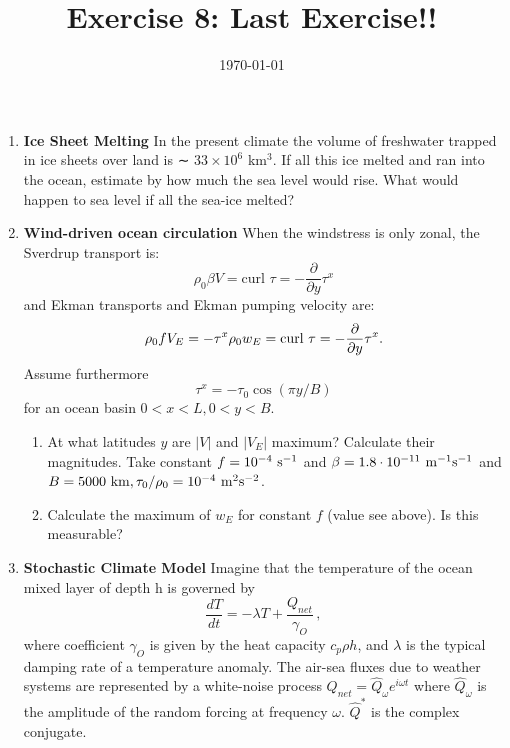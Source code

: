 \documentclass[a4paper,12pt]{article}
\title{Exercise 8: Last Exercise!!}
\date{\today}
\begin{document}
\maketitle
\thispagestyle{fancy}
\begin{enumerate}
\item {\bf Ice Sheet Melting} In the present climate the volume of freshwater trapped in ice sheets
over land is ∼ $33 \times 10^{6}$ km$^{3}$. If all this ice melted and ran into
the ocean, estimate by how much the sea level would rise. What would
happen to sea level if all the sea-ice melted? 

\item {\bf Wind-driven ocean circulation} When the windstress is only zonal, the Sverdrup transport is:
 \begin{equation}
\rho_0 \beta V = \mbox{curl } \tau = - \frac{\partial}{\partial y} {\tau^x} 
\end{equation}
 and Ekman transports and Ekman pumping velocity are:
\begin{equation}
\rho_0 f
      V_E = -{\tau^x} \\
\rho_0 w_E= \mbox{curl } \tau = - \frac{\partial}{\partial y}  {\tau^x} .
\end{equation}
Assume furthermore
\begin{equation}
\tau^x =
      -\tau_0 \cos (\pi y/B)
\end{equation}
 for an ocean basin $0<x<L, 0<y<B$.
\begin{enumerate}
\item At what latitudes $y$ are $|V|$ and $|V_E|$ maximum? Calculate their
magnitudes. Take constant $ f=10^{-4}\ \rm s^{-1}$ and $\beta=1.8
\cdot 10^{-11}\ \rm m^{-1} s^{-1}$ and $B=5000\ {\rm km},
\tau_0/\rho_0 = 10^{-4}\ \rm m^2 s^{-2}$.
\item Calculate the maximum of $w_E$ for constant $f$ (value see
      above).  Is this measurable?\\
\end{enumerate}

\item {\bf Stochastic Climate Model} Imagine that the temperature of
  the ocean mixed layer of depth h is governed by 
\begin{equation}
      \frac{dT}{dt} = -\lambda T + \frac{Q_{net}}{\gamma_{O}} \, ,
\end{equation}
where coefficient $ \gamma_{O} $ is given by the heat capacity $c_p
\rho h $, and $ \lambda $ is the typical damping rate of a temperature
anomaly.
The air-sea fluxes due to weather systems are represented by a
white-noise process $Q_{net}=\hat{Q}_{\omega}e^{i\omega t}$ where
$\hat{Q}_{\omega}$ is the amplitude of the random forcing at frequency $\omega$. $\hat{Q}^{*}$ is the complex conjugate.


\end{enumerate}
\end{document}
